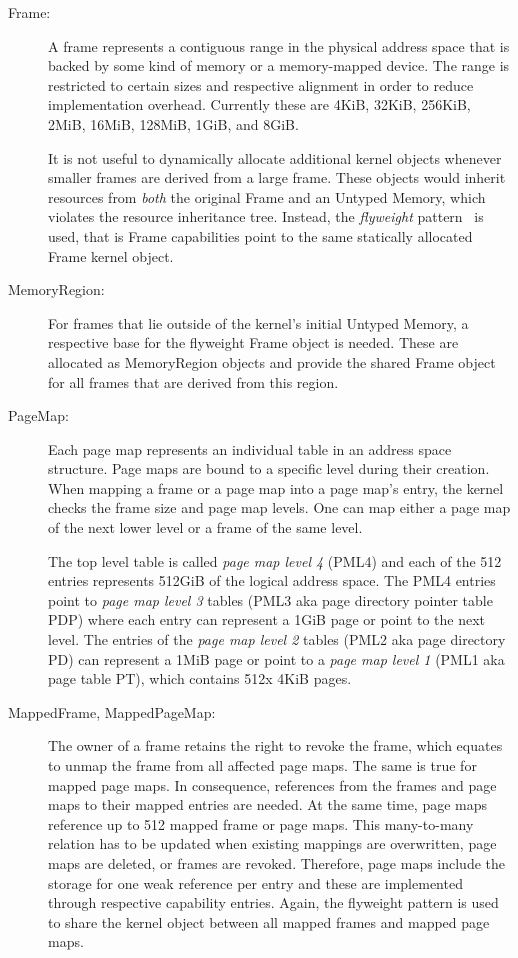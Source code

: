 \begin{description}
\item[Frame:] A frame represents a contiguous range in the physical address space that is backed by some kind of memory or a memory-mapped device. The range is restricted to certain sizes and respective alignment in order to reduce implementation overhead. Currently these are 4KiB, 32KiB, 256KiB, 2MiB, 16MiB, 128MiB, 1GiB, and 8GiB.

It is not useful to dynamically allocate additional kernel objects whenever smaller frames are derived from a large frame. These objects would inherit resources from \emph{both} the original Frame and an Untyped Memory, which violates the resource inheritance tree. Instead, the \emph{flyweight} pattern~\cite{gof} is used, that is Frame capabilities point to the same statically allocated Frame kernel object.

\item[MemoryRegion:] For frames that lie outside of the kernel's initial Untyped Memory, a respective base for the flyweight Frame object is needed. These are allocated as MemoryRegion objects and provide the shared Frame object for all frames that are derived from this region.  

\item[PageMap:] Each page map represents an individual table in an address space structure. Page maps are bound to a specific level during their creation. When mapping a frame or a page map into a page map's entry, the kernel checks the frame size and page map levels. One can map either a page map of the next lower level or a frame of the same level.

The top level table is called \emph{page map level 4} (PML4) and each of the 512 entries represents 512GiB of the logical address space. The PML4 entries point to \emph{page map level 3} tables (PML3 aka page directory pointer table PDP) where each entry can represent a 1GiB page or point to the next level. The entries of the \emph{page map level 2} tables (PML2 aka page directory PD) can represent a 1MiB page or point to a \emph{page map level 1} (PML1 aka page table PT), which contains 512x 4KiB pages.

\item[MappedFrame, MappedPageMap:] 
The owner of a frame retains the right to revoke the frame, which equates to unmap the frame from all affected page maps. The same is true for mapped page maps. In consequence, references from the frames and page maps to their mapped entries are needed. At the same time, page maps reference up to 512 mapped frame or page maps. This many-to-many relation has to be updated when existing mappings are overwritten, page maps are deleted, or frames are revoked. 
Therefore, \mythos page maps include the storage for one weak reference per entry and these are implemented through respective capability entries. 
Again, the flyweight pattern is used to share the kernel object between all mapped frames and mapped page maps. 
\end{description}

